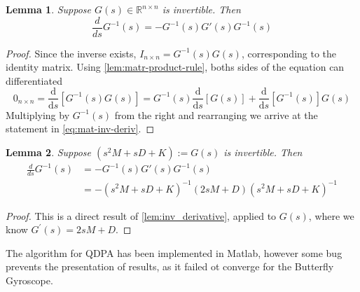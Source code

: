 \documentclass{article}
\newcommand{\diff}{\mathrm{d}}
\newtheorem{lemma}{Lemma}
\begin{document}
	\begin{lemma}\label{lem:inv_derivative}
		Suppose $G(s) \in \mathbb{R}^{n\times n}$ is invertible. Then
		\begin{equation}\label{eq:mat-inv-deriv}
			\frac{d}{d s}G^{-1}(s)=-G^{-1}(s)G'(s)G^{-1}(s)
		\end{equation}
	\end{lemma}
	\begin{proof}
		Since the inverse exists, $I_{n\times n} = G^{-1}(s) G(s) $, corresponding to the identity matrix.
		Using \autoref{lem:matr-product-rule}, boths sides of the equation can differentiated
		\begin{equation*}
			0_{n\times n} = \frac{\diff}{\diff s} \left[ G^{-1}(s) G(s) \right] = G^{-1}(s) \frac{\diff}{\diff s} \left[  G(s) \right] + \frac{\diff}{\diff s} \left[ G^{-1}(s) \right]  G(s)
		\end{equation*}
		Multiplying by $G^{-1}(s)$ from the right and rearranging we arrive at the statement in \autoref{eq:mat-inv-deriv}.
	\end{proof}
	
	\begin{lemma}\label{lem:quadraticDPA}
		Suppose $(s^2M+sD+K):=G(s)$ is invertible. Then
		\begin{align*}
			\frac{d}{d s}G^{-1}(s)&=-G^{-1}(s)G'(s)G^{-1}(s)\\
			&=-(s^2M+sD+K)^{-1}(2sM+D)(s^2M+sD+K)^{-1}
		\end{align*}
	\end{lemma}
	\begin{proof}
		This is a direct result of \autoref{lem:inv_derivative}, applied to $G(s)$, where we know $G^\prime(s) = 2 s M + D$. 
	\end{proof}
	
The algorithm for QDPA has been implemented in Matlab, however some bug prevents the presentation of results, as it failed ot converge for the Butterfly Gyroscope.
	
\end{document}
